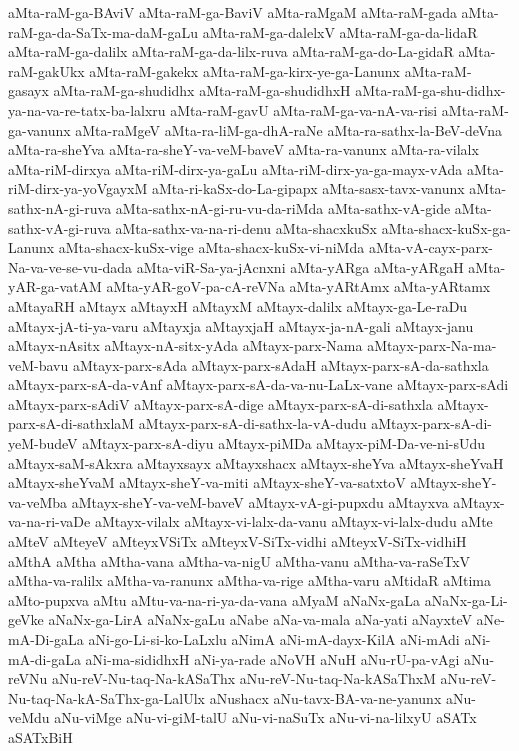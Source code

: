 {aMta-raM-ga-BAviV
aMta-raM-ga-BaviV
aMta-raMgaM
aMta-raM-gada
aMta-raM-ga-da-SaTx-ma-daM-gaLu
aMta-raM-ga-dalelxV
aMta-raM-ga-da-lidaR
aMta-raM-ga-dalilx
aMta-raM-ga-da-lilx-ruva
aMta-raM-ga-do-La-gidaR
aMta-raM-gakUkx
aMta-raM-gakekx
aMta-raM-ga-kirx-ye-ga-Lanunx
aMta-raM-gasayx
aMta-raM-ga-shudidhx
aMta-raM-ga-shudidhxH
aMta-raM-ga-shu-didhx-ya-na-va-re-tatx-ba-lalxru
aMta-raM-gavU
aMta-raM-ga-va-nA-va-risi
aMta-raM-ga-vanunx
aMta-raMgeV
aMta-ra-liM-ga-dhA-raNe
aMta-ra-sathx-la-BeV-deVna
aMta-ra-sheYva
aMta-ra-sheY-va-veM-baveV
aMta-ra-vanunx
aMta-ra-vilalx
aMta-riM-dirxya
aMta-riM-dirx-ya-gaLu
aMta-riM-dirx-ya-ga-mayx-vAda
aMta-riM-dirx-ya-yoVgayxM
aMta-ri-kaSx-do-La-gipapx
aMta-sasx-tavx-vanunx
aMta-sathx-nA-gi-ruva
aMta-sathx-nA-gi-ru-vu-da-riMda
aMta-sathx-vA-gide
aMta-sathx-vA-gi-ruva
aMta-sathx-va-na-ri-denu
aMta-shacxkuSx
aMta-shacx-kuSx-ga-Lanunx
aMta-shacx-kuSx-vige
aMta-shacx-kuSx-vi-niMda
aMta-vA-cayx-parx-Na-va-ve-se-vu-dada
aMta-viR-Sa-ya-jAcnxni
aMta-yARga
aMta-yARgaH
aMta-yAR-ga-vatAM
aMta-yAR-goV-pa-cA-reVNa
aMta-yARtAmx
aMta-yARtamx
aMtayaRH
aMtayx
aMtayxH
aMtayxM
aMtayx-dalilx
aMtayx-ga-Le-raDu
aMtayx-jA-ti-ya-varu
aMtayxja
aMtayxjaH
aMtayx-ja-nA-gali
aMtayx-janu
aMtayx-nAsitx
aMtayx-nA-sitx-yAda
aMtayx-parx-Nama
aMtayx-parx-Na-ma-veM-bavu
aMtayx-parx-sAda
aMtayx-parx-sAdaH
aMtayx-parx-sA-da-sathxla
aMtayx-parx-sA-da-vAnf
aMtayx-parx-sA-da-va-nu-LaLx-vane
aMtayx-parx-sAdi
aMtayx-parx-sAdiV
aMtayx-parx-sA-dige
aMtayx-parx-sA-di-sathxla
aMtayx-parx-sA-di-sathxlaM
aMtayx-parx-sA-di-sathx-la-vA-dudu
aMtayx-parx-sA-di-yeM-budeV
aMtayx-parx-sA-diyu
aMtayx-piMDa
aMtayx-piM-Da-ve-ni-sUdu
aMtayx-saM-sAkxra
aMtayxsayx
aMtayxshacx
aMtayx-sheYva
aMtayx-sheYvaH
aMtayx-sheYvaM
aMtayx-sheY-va-miti
aMtayx-sheY-va-satxtoV
aMtayx-sheY-va-veMba
aMtayx-sheY-va-veM-baveV
aMtayx-vA-gi-pupxdu
aMtayxva
aMtayx-va-na-ri-vaDe
aMtayx-vilalx
aMtayx-vi-lalx-da-vanu
aMtayx-vi-lalx-dudu
aMte
aMteV
aMteyeV
aMteyxVSiTx
aMteyxV-SiTx-vidhi
aMteyxV-SiTx-vidhiH
aMthA
aMtha
aMtha-vana
aMtha-va-nigU
aMtha-vanu
aMtha-va-raSeTxV
aMtha-va-ralilx
aMtha-va-ranunx
aMtha-va-rige
aMtha-varu
aMtidaR
aMtima
aMto-pupxva
aMtu
aMtu-va-na-ri-ya-da-vana
aMyaM
aNaNx-gaLa
aNaNx-ga-Li-geVke
aNaNx-ga-LirA
aNaNx-gaLu
aNabe
aNa-va-mala
aNa-yati
aNayxteV
aNe-mA-Di-gaLa
aNi-go-Li-si-ko-LaLxlu
aNimA
aNi-mA-dayx-KilA
aNi-mAdi
aNi-mA-di-gaLa
aNi-ma-sididhxH
aNi-ya-rade
aNoVH
aNuH
aNu-rU-pa-vAgi
aNu-reVNu
aNu-reV-Nu-taq-Na-kASaThx
aNu-reV-Nu-taq-Na-kASaThxM
aNu-reV-Nu-taq-Na-kA-SaThx-ga-LalUlx
aNushacx
aNu-tavx-BA-va-ne-yanunx
aNu-veMdu
aNu-viMge
aNu-vi-giM-talU
aNu-vi-naSuTx
aNu-vi-na-lilxyU
aSATx
aSATxBiH
}
